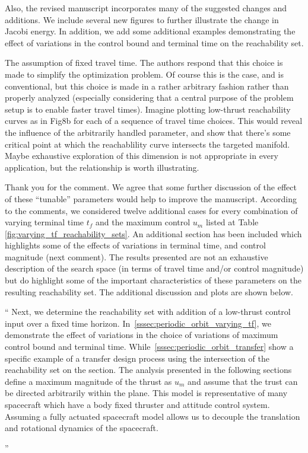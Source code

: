 \documentclass[11pt]{article}
\newenvironment{correction}{\begin{list}{}{\setlength{\leftmargin}{1cm}\setlength{\rightmargin}{1cm}}\vspace{\parsep}\item[]``}{''\end{list}}
\begin{document}
Also, the revised manuscript incorporates many of the suggested changes and additions.
We include several new figures to further illustrate the change in Jacobi energy.
In addition, we add some additional examples demonstrating the effect of variations in the control bound and terminal time on the reachability set.

\begin{itemize}
    \item 
        \begin{itshape}
            The assumption of fixed travel time.  The authors respond that this choice is made to simplify the optimization problem.  Of course this is the case, and is conventional, but this choice is made in a rather arbitrary fashion rather than properly analyzed (especially considering that a central purpose of the problem setup is to enable faster travel times).  Imagine plotting low-thrust reachability curves as in Fig8b for each of a sequence of travel time choices.  This would reveal the influence of the arbitrarily handled parameter, and show that there's some critical point at which the reachablility curve intersects the targeted manifold.  Maybe exhaustive exploration of this dimension is not appropriate in every application, but the relationship is worth illustrating.
        \end{itshape}

        Thank you for the comment. 
        We agree that some further discussion of the effect of these ``tunable'' parameters would help to improve the manuscript. 
		According to the comments, we considered twelve additional cases for every combination of varying terminal time $t_f$ and the maximum control $u_m$ listed at Table \ref{fig:varying_tf_reachability_sets}. 
        An additional section has been included which highlights some of the effects of variations in terminal time, and control magnitude (next comment).
        The results presented are not an exhaustive description of the search space (in terms of travel time and/or control magnitude) but do highlight some of the important characteristics of these parameters on the resulting reachability set.
        The additional discussion and plots are shown below.
        
        \begin{correction}
            Next, we determine the reachability set with addition of a low-thrust control input over a fixed time horizon.
            In~\cref{sssec:periodic_orbit_varying_tf}, we demonstrate the effect of variations in the choice of variations of maximum control bound and terminal time.
            While~\cref{sssec:periodic_orbit_transfer} show a specific example of a transfer design process using the intersection of the reachability set on the \Poincare section.
            The analysis presented in the following sections define a maximum magnitude of the thrust as \( u_{m} \) and assume that the trust can be directed arbitrarily within the plane. 
            This model is representative of many spacecraft which have a body fixed thruster and attitude control system.
            Assuming a fully actuated spacecraft model allows us to decouple the translation and rotational dynamics of the spacecraft.


\end{correction}
\end{itemize}
\end{document}
